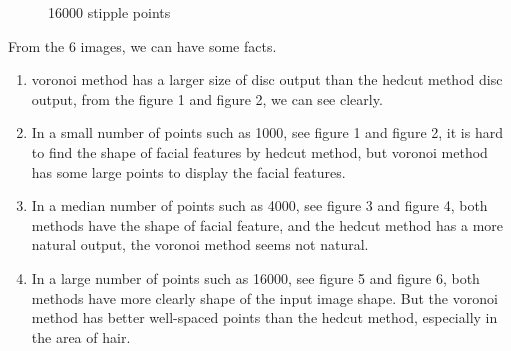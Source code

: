 \documentclass[11pt]{article}
\begin{document}
\begin{figure}[htbp]
\begin{minipage}[t]{0.48\textwidth}
\caption{16000 stipple points}
\end{minipage}
\end{figure}



From the 6 images, we can have some facts.
\begin{enumerate}
\item voronoi method has a larger size of disc output than the hedcut method disc output, from the figure 1 and figure 2, we can see clearly.
\item In a small number of points such as 1000, see figure 1 and figure 2, it is hard to find the shape of facial features by hedcut method, but voronoi method has some large points to display the facial features.
\item In a median number of points such as 4000, see figure 3 and figure 4, both methods have the shape of facial feature, and the hedcut method has a more natural output, the voronoi method seems not natural.
\item In a large number of points such as 16000, see figure 5 and figure 6, both methods have more clearly shape of the input image shape. But the voronoi method has better well-spaced points than the hedcut method, especially in the area of hair.

\end{enumerate}
\end{document}
